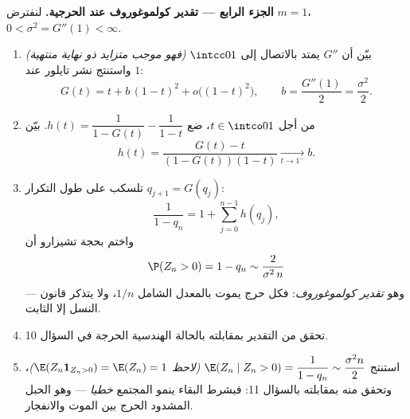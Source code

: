 \begin{problem}
\medskip
\noindent\textbf{الجزء الرابع --- تقدير كولموغوروف عند الحرجية.}
لنفترض $m = 1$، $0 < \sigma^2 = G''(1) <
\infty$.
\begin{enumerate}[resume]
  \item بيّن أن $G''$ يمتد بالاتصال إلى $\intcc01$ \emph{(فهو موجب
        متزايد ذو نهاية منتهية)} واستنتج نشر تايلور عند $1$:
        \[
        G(t) = t + b\,(1-t)^2 + o\bigl((1-t)^2\bigr),
        \qquad b = \frac{G''(1)}2 = \frac{\sigma^2}2 .
        \]
  \item من أجل $t \in \intco01$، ضع $h(t) = \dfrac1{1 - G(t)} -
        \dfrac1{1 - t}$. بيّن
        \[
        h(t) = \frac{G(t) - t}{(1 - G(t))(1 - t)}
        \xrightarrow[t\to1^-]{} b .
        \]
  \item تلسكب على طول التكرار $q_{j+1} = G(q_j)$:
        \[
        \frac1{1 - q_n} = 1 + \sum_{j=0}^{n-1}h(q_j),
        \]
        واختم بحجة تشيزارو أن
        \[
        \P(Z_n > 0) = 1 - q_n \sim \frac{2}{\sigma^2\,n}
        \]
        --- وهو \emph{تقدير كولموغوروف}: فكل  حرج يموت
        بالمعدل الشامل $1/n$، ولا يتذكر قانون النسل إلا الثابت.
  \item تحقق من التقدير بمقابلته بالحالة الهندسية الحرجة في السؤال
        10.
  \item استنتج $\E(Z_n \mid Z_n > 0) = \dfrac{1}{1 - q_n}
        \sim \dfrac{\sigma^2 n}{2}$ \emph{(لاحظ $\E(Z_n
        \mathbf 1_{Z_n>0}) = \E(Z_n) = 1$)}، وتحقق منه بمقابلته
        بالسؤال 11: فبشرط البقاء ينمو المجتمع \emph{خطيا} --- وهو
        الحبل المشدود الحرج بين الموت والانفجار.
\end{enumerate}


\end{problem}
